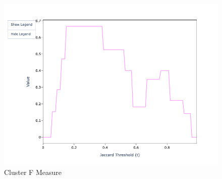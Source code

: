 \documentclass[a4paper,twoside]{article}
\begin{document}
\begin{figure}
\begin{minipage}{0.32\textwidth}
            \includegraphics[width=\textwidth]{sample-usage/mini-alg-cf}
            \caption{Cluster F Measure}
        \end{minipage}
    \end{figure}
\end{document}
